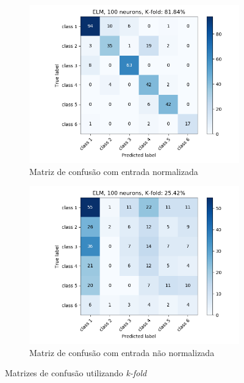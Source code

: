 \documentclass[paper=a4, fontsize=11pt]{scrartcl}
\numberwithin{equation}{section}		%
\numberwithin{figure}{section}			%
\numberwithin{table}{section}				%
\begin{document}
	\begin{figure}[h!]
		\begin{subfigure}{.45\textwidth}
			\centering
			\includegraphics[width=\linewidth]{img/q3_elm_kfold_norm.png}
			\caption{Matriz de confusão com entrada normalizada}
			\label{fig:q1grau2}
		\end{subfigure}%
		\begin{subfigure}{.45\textwidth}
			\centering
			\includegraphics[width=\linewidth]{img/q3_elm_kfold_notNorm.png}
			\caption{Matriz de confusão com entrada não normalizada}
			\label{fig:q1_grau3}
		\end{subfigure}
		\caption{Matrizes de confusão utilizando \textit{k-fold}}
		\label{fig:ELM_confusao_kfold}
	\end{figure}
	
\end{document}
